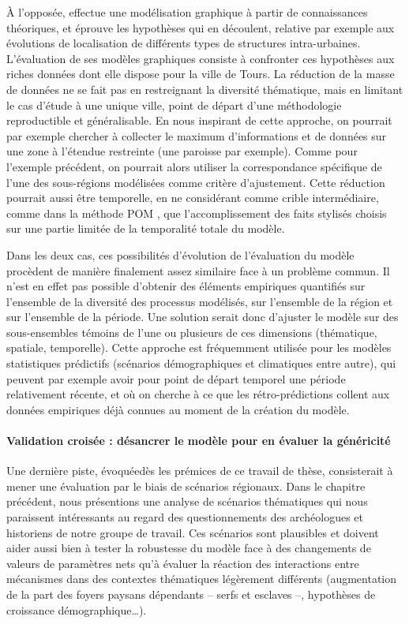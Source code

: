 \noindent À l'opposée, \textcite{nahassia_formes_2019} effectue une modélisation graphique à partir de connaissances théoriques, et éprouve les hypothèses qui en découlent, relative par exemple aux évolutions de localisation de différents types de structures intra-urbaines.
L'évaluation de ses modèles graphiques consiste à confronter ces hypothèses aux riches données dont elle dispose pour la ville de Tours.
La réduction de la masse de données ne se fait pas en restreignant la diversité thématique, mais en limitant le cas d'étude à une unique ville, point de départ d'une méthodologie reproductible et généralisable.
En nous inspirant de cette approche, on pourrait par exemple chercher à collecter le maximum d'informations et de données sur une zone à l'étendue restreinte (une paroisse par exemple).
Comme pour l'exemple précédent, on pourrait alors utiliser la correspondance spécifique de l'une des sous-régions modélisées comme critère d'ajustement.
Cette réduction pourrait aussi être temporelle, en ne considérant comme \og crible intermédiaire\fg{}, comme dans la méthode POM \autocite{grimm_pattern-oriented_2005}, que l'accomplissement des faits stylisés choisis sur une partie limitée de la temporalité totale du modèle.

\noindent Dans les deux cas, ces possibilités d'évolution de l'évaluation du modèle procèdent de manière finalement assez similaire face à un problème commun.
Il n'est en effet pas possible d'obtenir des éléments empiriques quantifiés sur l'ensemble de la diversité des processus modélisés, sur l'ensemble de la région et sur l'ensemble de la période.
Une solution serait donc d'ajuster le modèle sur des sous-ensembles témoins de l'une ou plusieurs de ces dimensions (thématique, spatiale, temporelle).
Cette approche est fréquemment utilisée pour les modèles statistiques prédictifs (scénarios démographiques et climatiques entre autre), qui peuvent par exemple avoir pour point de départ temporel une période relativement récente, et où on cherche à ce que les \og rétro-prédictions\fg{} collent aux données empiriques déjà connues au moment de la création du modèle.


\paragraph{Validation croisée : désancrer le modèle pour en évaluer la généricité}
Une dernière piste, évoquée\noindent  dès les prémices de ce travail de thèse, consisterait à mener une évaluation par le biais de \og scénarios régionaux\fg{}.
Dans le chapitre précédent, nous présentions une analyse de scénarios thématiques qui nous paraissent intéressants au regard des questionnements des archéologues et historiens de notre groupe de travail.
Ces scénarios sont plausibles et doivent aider aussi bien à tester la robustesse du modèle face à des changements de valeurs de paramètres nets qu'à évaluer la réaction des interactions entre mécanismes dans des contextes thématiques légèrement différents (augmentation de la part des foyers paysans dépendants -- serfs et esclaves --, hypothèses de croissance démographique\ldots).

